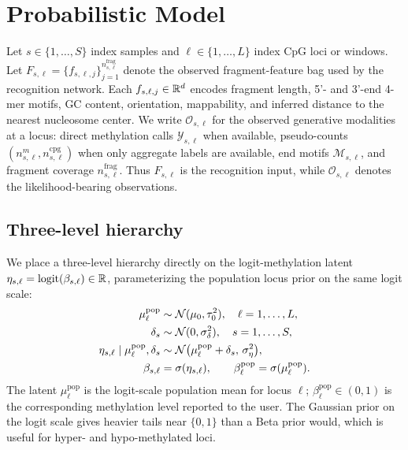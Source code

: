 \section{Probabilistic Model}
\label{sec:model}

Let $s\in\{1,\dots,S\}$ index samples and $\ell\in\{1,\dots,L\}$ index CpG loci or windows. Let $F_{s,\ell}=\{f_{s,\ell,j}\}_{j=1}^{n^{\mathrm{frag}}_{s,\ell}}$ denote the observed fragment-feature bag used by the recognition network. Each $f_{s,\ell,j}\in\mathbb{R}^d$ encodes fragment length, 5'- and 3'-end 4-mer motifs, GC content, orientation, mappability, and inferred distance to the nearest nucleosome center. We write $\mathcal{O}_{s,\ell}$ for the observed generative modalities at a locus: direct methylation calls $\mathcal{Y}_{s,\ell}$ when available, pseudo-counts $(n^m_{s,\ell},n^{\mathrm{cpg}}_{s,\ell})$ when only aggregate labels are available, end motifs $\mathcal{M}_{s,\ell}$, and fragment coverage $n^{\mathrm{frag}}_{s,\ell}$. Thus $F_{s,\ell}$ is the recognition input, while $\mathcal{O}_{s,\ell}$ denotes the likelihood-bearing observations.

\subsection{Three-level hierarchy}
We place a three-level hierarchy directly on the logit-methylation latent $\eta_{s,\ell}=\mathrm{logit}(\beta_{s,\ell})\in\mathbb{R}$, parameterizing the population locus prior on the same logit scale:
\begin{align}
\mu^{\mathrm{pop}}_\ell &\sim \mathcal{N}(\mu_0, \tau_0^2), \quad \ell=1,\dots,L, \label{eq:pop}\\
\delta_s &\sim \mathcal{N}(0, \sigma_\delta^2), \quad s=1,\dots,S, \label{eq:samp}\\
\eta_{s,\ell}\mid \mu^{\mathrm{pop}}_\ell, \delta_s &\sim \mathcal{N}\big(\mu^{\mathrm{pop}}_\ell+\delta_s,\,\sigma_\eta^2\big),\label{eq:cell}\\
\beta_{s,\ell} &= \sigma(\eta_{s,\ell}),\qquad
\beta^{\mathrm{pop}}_\ell = \sigma(\mu^{\mathrm{pop}}_\ell).
\end{align}
The latent $\mu^{\mathrm{pop}}_\ell$ is the logit-scale population mean for locus $\ell$; $\beta^{\mathrm{pop}}_\ell\in(0,1)$ is the corresponding methylation level reported to the user. The Gaussian prior on the logit scale gives heavier tails near $\{0,1\}$ than a Beta prior would, which is useful for hyper- and hypo-methylated loci.

